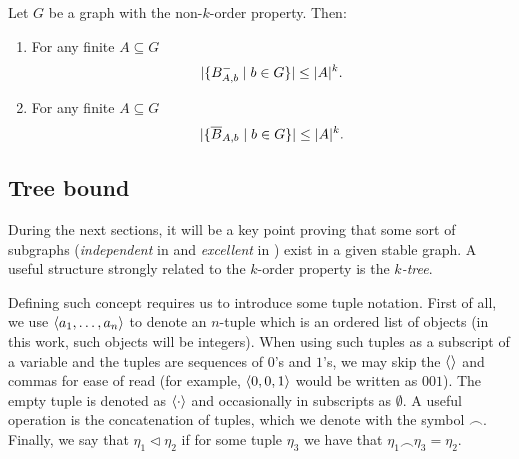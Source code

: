         \begin{corollary} \label{cor:k_order_propery_bounds_BAbs}
            Let $G$ be a graph with the non-$k$-order property.
            Then:
            \begin{enumerate}[label={\Roman*}., ref={\Roman*}, font=\rmfamily]
                \item\label{itm:k_order_propery_bounds_BAbs.1} For any finite $A \subseteq G$
                    \[
                        | \{ B^-_{A,b} \mid b \in G \} |
                            \leq |A|^k.
                    \]
                \item\label{itm:k_order_propery_bounds_BAbs.2} For any finite $A \subseteq G$
                    \[
                        | \{ \overline{B}_{A,b} \mid b \in G \} |
                            \leq |A|^k.
                    \]
            \end{enumerate}
        \end{corollary}

    \subsection{Tree bound} \label{subsec:subsection_3.3}

        During the next sections, it will be a key point proving that some sort of  subgraphs
        (\emph{independent} in  and \emph{excellent} in ) exist in a given
        stable graph.
        A useful structure strongly related to the $k$-order property is the \emph{$k$-tree}.

        Defining such concept requires us to introduce some tuple notation.
        First of all, we use $\left< a_1, \dots, a_n \right>$ to denote an $n$-tuple which is an ordered list of objects
        (in this work, such objects will be integers).
        When using such tuples as a subscript of a variable and the tuples are sequences of $0$'s and $1$'s, we
        may skip the $\left<  \right>$ and commas for ease of read (for example, $\left< 0,0,1 \right>$ would be
        written as $001$).
        The empty tuple is denoted as $\left< \cdot \right>$ and occasionally in subscripts as $\emptyset$.
        A useful operation is the concatenation of tuples, which we denote with the symbol $\frown$.
        Finally, we say that $\eta_1 \triangleleft \eta_2$ if for some tuple $\eta_3$ we have that
        $\eta_1 \frown \eta_3 = \eta_2$.

